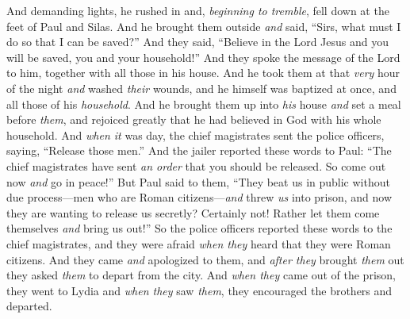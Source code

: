 \begin{biblechapter}
\verse And demanding lights, he rushed in and, \textit{beginning to tremble}, fell down at the feet of Paul and Silas.
\verse And he brought them outside \textit{and} said, “Sirs, what must I do so that I can be saved?”
\verse And they said, “Believe in the Lord Jesus and you will be saved, you and your household!”
\verse And they spoke the message of the Lord to him, together with all those in his house.
\verse And he took them at that \textit{very} hour of the night \textit{and} washed \textit{their} wounds, and he himself was baptized at once, and all those of his \textit{household}.
\verse And he brought them up into \textit{his} house \textit{and} set a meal before \textit{them}, and rejoiced greatly that he had believed in God with his whole household.
 And \textit{when it} was day, the chief magistrates sent the police officers, saying, “Release those men.”
\verse And the jailer reported these words to Paul: “The chief magistrates have sent \textit{an order} that you should be released. So come out now \textit{and} go in peace!”
\verse But Paul said to them, “They beat us in public without due process—men who are Roman citizens—\textit{and} threw \textit{us} into prison, and now they are wanting to release us secretly? Certainly not! Rather let them come themselves \textit{and} bring us out!”
\verse So the police officers reported these words to the chief magistrates, and they were afraid \textit{when they} heard that they were Roman citizens.
\verse And they came \textit{and} apologized to them, and \textit{after they} brought \textit{them} out they asked \textit{them} to depart from the city.
\verse And \textit{when they} came out of the prison, they went to Lydia and \textit{when they} saw \textit{them}, they encouraged the brothers and departed.
\end{biblechapter}

